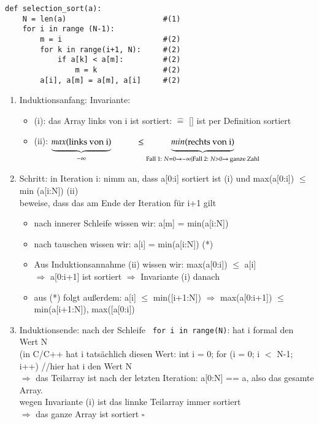 \begin{itemize}
        \begin{verbatim}
def selection_sort(a):
    N = len(a)                      #(1)
    for i in range (N-1):
        m = i                       #(2)
        for k in range(i+1, N):     #(2)
            if a[k] < a[m]:         #(2)
                m = k               #(2)
        a[i], a[m] = a[m], a[i]     #(2)
        \end{verbatim}
        \begin{enumerate}
        \item Induktionsanfang: Invariante:
        \begin{itemize}[label={}]
        \item (i): das Array links von i ist sortiert: $\widehat{=}$ [] ist per Definition sortiert
        \item (ii): $\underbrace{max(\text{links von i})}_{- \infty}\hspace*{1cm} \leq \underbrace{min(\text{rechts von i})}_{\text{Fall 1: } N = 0 \rightarrow - \infty |
            \text{Fall 2: } N > 0 \rightarrow \text{ ganze Zahl}}$
        \end{itemize}
        \item Schritt: in Iteration i: nimm an, dass a[0:i] sortiert ist (i) und max(a[0:i]) $\leq$ min (a[i:N]) (ii)\\
        beweise, dass das am Ende der Iteration für i+1 gilt
        \begin{itemize}
        \item nach innerer Schleife wissen wir: a[m] = min(a[i:N])
        \item nach tauschen wissen wir: a[i] = min(a[i:N]) (*)
        \item Aus Induktionsannahme (ii) wissen wir: max(a[0:i]) $\leq$ a[i] \\
        $\Rightarrow$ a[0:i+1] ist sortiert $\Rightarrow$ Invariante (i) danach
        \item aus (*) folgt außerdem: a[i] $\leq$ min([i+1:N]) $\Rightarrow$ max(a[0:i+1]) $\leq$ min(a[i+1:N]), max([a[0:i])
        \end{itemize}
        \item Induktionsende: nach der Schleife \verb| for i in range(N)|: hat i formal den Wert N\\
        (in C/C++ hat i tatsächlich diesen Wert: int i = 0; for (i = 0; i $<$ N-1; i++) {} //hier hat i den Wert N \\
        $\Rightarrow$ das Teilarray ist nach der letzten Iteration: a[0:N] == a, also das gesamte Array.\\
        wegen Invariante (i) ist das linnke Teilarray immer sortiert \\
        $\Rightarrow$ das ganze Array ist sortiert \hspace*{9cm} $\square$
        \end{enumerate}
    \end{itemize}


